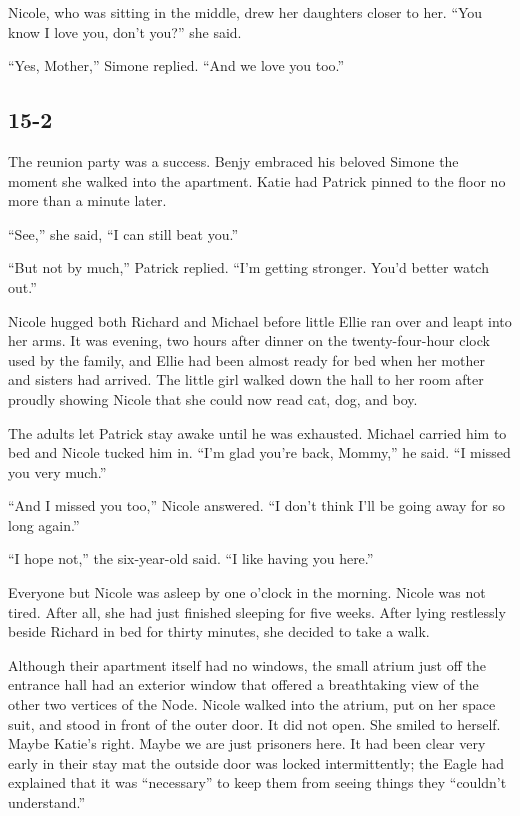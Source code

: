 \documentclass[]{article}
\begin{document}
{Nicole, who was sitting in the middle, drew her daughters closer to her. “You know I love you, don’t you?” she said.

“Yes, Mother,” Simone replied. “And we love you too.”

\subsection{15-2}

The reunion party was a success. Benjy embraced his beloved Simone the moment she walked into the apartment. Katie had Patrick pinned to the floor no more than a minute later.

“See,” she said, “I can still beat you.”

“But not by much,” Patrick replied. “I’m getting stronger. You’d better watch out.”

Nicole hugged both Richard and Michael before little Ellie ran over and leapt into her arms. It was evening, two hours after dinner on the twenty-four-hour clock used by the family, and Ellie had been almost ready for bed when her mother and sisters had arrived. The little girl walked down the hall to her room after proudly showing Nicole that she could now read cat, dog, and boy.

The adults let Patrick stay awake until he was exhausted. Michael carried him to bed and Nicole tucked him in. “I’m glad you’re back, Mommy,” he said. “I missed you very much.”

“And I missed you too,” Nicole answered. “I don’t think I’ll be going away for so long again.”

“I hope not,” the six-year-old said. “I like having you here.”

Everyone but Nicole was asleep by one o’clock in the morning. Nicole was not tired. After all, she had just finished sleeping for five weeks. After lying restlessly beside Richard in bed for thirty minutes, she decided to take a walk.

Although their apartment itself had no windows, the small atrium just off the entrance hall had an exterior window that offered a breathtaking view of the other two vertices of the Node. Nicole walked into the atrium, put on her space suit, and stood in front of the outer door. It did not open. She smiled to herself. Maybe Katie’s right. Maybe we are just prisoners here. It had been clear very early in their stay mat the outside door was locked intermittently; the Eagle had explained that it was “necessary” to keep them from seeing things they “couldn’t understand.”

}
\end{document}
